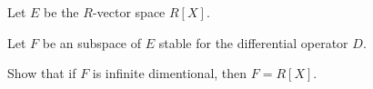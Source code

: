Let $E$ be the $R$-vector space $R[X]$.

Let $F$ be an subspace of $E$ stable for the differential operator $D$.

Show that if $F$ is infinite dimentional, then $F = R[X]$.
